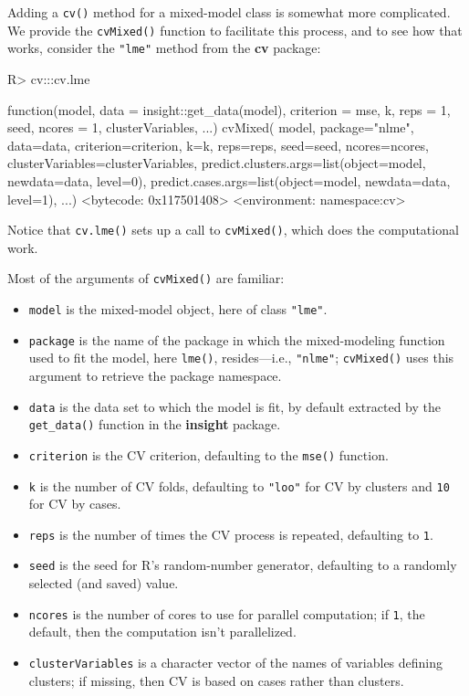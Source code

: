 \documentclass[
]{jss}
\begin{document}
Adding a \texttt{cv()} method for a mixed-model class is somewhat more
complicated. We provide the \texttt{cvMixed()} function to facilitate
this process, and to see how that works, consider the \texttt{"lme"}
method from the \textbf{cv} package:

\begin{CodeChunk}
\begin{CodeInput}
R> cv:::cv.lme
\end{CodeInput}
\begin{CodeOutput}
function(model, data = insight::get_data(model), criterion = mse,
                   k, reps = 1, seed, ncores = 1, clusterVariables, ...){
  cvMixed(
    model,
    package="nlme",
    data=data,
    criterion=criterion,
    k=k,
    reps=reps,
    seed=seed,
    ncores=ncores,
    clusterVariables=clusterVariables,
    predict.clusters.args=list(object=model,
                               newdata=data,
                               level=0),
    predict.cases.args=list(object=model,
                            newdata=data,
                            level=1),
    ...)
}
<bytecode: 0x117501408>
<environment: namespace:cv>
\end{CodeOutput}
\end{CodeChunk}

Notice that \texttt{cv.lme()} sets up a call to \texttt{cvMixed()},
which does the computational work.

Most of the arguments of \texttt{cvMixed()} are familiar:

\begin{itemize}
\item
  \texttt{model} is the mixed-model object, here of class
  \texttt{"lme"}.
\item
  \texttt{package} is the name of the package in which the
  mixed-modeling function used to fit the model, here \texttt{lme()},
  resides---i.e., \texttt{"nlme"}; \texttt{cvMixed()} uses this argument
  to retrieve the package namespace.
\item
  \texttt{data} is the data set to which the model is fit, by default
  extracted by the \texttt{get\_data()} function in the \textbf{insight}
  package.
\item
  \texttt{criterion} is the CV criterion, defaulting to the
  \texttt{mse()} function.
\item
  \texttt{k} is the number of CV folds, defaulting to \texttt{"loo"} for
  CV by clusters and \texttt{10} for CV by cases.
\item
  \texttt{reps} is the number of times the CV process is repeated,
  defaulting to \texttt{1}.
\item
  \texttt{seed} is the seed for R's random-number generator, defaulting
  to a randomly selected (and saved) value.
\item
  \texttt{ncores} is the number of cores to use for parallel
  computation; if \texttt{1}, the default, then the computation isn't
  parallelized.
\item
  \texttt{clusterVariables} is a character vector of the names of
  variables defining clusters; if missing, then CV is based on cases
  rather than clusters.
\end{itemize}
\end{document}
